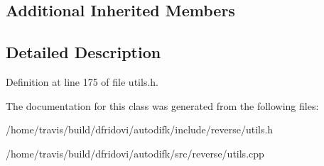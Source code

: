 \subsection*{Additional Inherited Members}


\subsection{Detailed Description}


Definition at line 175 of file utils.\-h.



The documentation for this class was generated from the following files\-:\begin{DoxyCompactItemize}
\item 
/home/travis/build/dfridovi/autodifk/include/reverse/utils.\-h\item 
/home/travis/build/dfridovi/autodifk/src/reverse/utils.\-cpp\end{DoxyCompactItemize}

